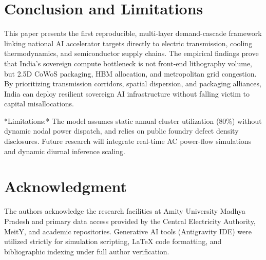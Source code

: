 \documentclass[conference]{IEEEtran}
\begin{document}
\section{Conclusion and Limitations}
This paper presents the first reproducible, multi-layer demand-cascade framework linking national AI accelerator targets directly to electric transmission, cooling thermodynamics, and semiconductor supply chains. The empirical findings prove that India's sovereign compute bottleneck is not front-end lithography volume, but 2.5D CoWoS packaging, HBM allocation, and metropolitan grid congestion. By prioritizing transmission corridors, spatial dispersion, and packaging alliances, India can deploy resilient sovereign AI infrastructure without falling victim to capital misallocations.

*Limitations:* The model assumes static annual cluster utilization (80\%) without dynamic nodal power dispatch, and relies on public foundry defect density disclosures. Future research will integrate real-time AC power-flow simulations and dynamic diurnal inference scaling.

\section*{Acknowledgment}
The authors acknowledge the research facilities at Amity University Madhya Pradesh and primary data access provided by the Central Electricity Authority, MeitY, and academic repositories. Generative AI tools (Antigravity IDE) were utilized strictly for simulation scripting, LaTeX code formatting, and bibliographic indexing under full author verification.



\end{document}
